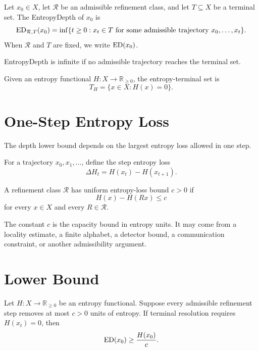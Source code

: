 \begin{definition}[EntropyDepth]
Let \(x_0\in X\), let \(\mathcal R\) be an admissible refinement class, and let
\(T\subseteq X\) be a terminal set. The EntropyDepth of \(x_0\) is
\[
\mathrm{ED}_{\mathcal R,T}(x_0)
=
\inf\{t\ge 0:x_t\in T
\text{ for some admissible trajectory }x_0,\ldots,x_t\}.
\]
When \(\mathcal R\) and \(T\) are fixed, we write \(\mathrm{ED}(x_0)\).
\end{definition}

EntropyDepth is infinite if no admissible trajectory reaches the terminal set.

\begin{definition}
Given an entropy functional \(H:X\to\mathbb R_{\ge 0}\), the entropy-terminal
set is
\[
T_H=\{x\in X:H(x)=0\}.
\]
\end{definition}

\section{One-Step Entropy Loss}

The depth lower bound depends on the largest entropy loss allowed in one step.

\begin{definition}
For a trajectory \(x_0,x_1,\ldots\), define the step entropy loss
\[
\Delta H_t=H(x_t)-H(x_{t+1}).
\]
\end{definition}

\begin{definition}
A refinement class \(\mathcal R\) has uniform entropy-loss bound \(c>0\) if
\[
H(x)-H(Rx)\le c
\]
for every \(x\in X\) and every \(R\in\mathcal R\).
\end{definition}

The constant \(c\) is the capacity bound in entropy units. It may come from a
locality estimate, a finite alphabet, a detector bound, a communication
constraint, or another admissibility argument.

\section{Lower Bound}

\begin{theorem}
Let \(H:X\to\mathbb R_{\ge 0}\) be an entropy functional. Suppose every
admissible refinement step removes at most \(c>0\) units of entropy. If
terminal resolution requires \(H(x_t)=0\), then
\[
\mathrm{ED}(x_0)\ge \frac{H(x_0)}{c}.
\]
\end{theorem}


